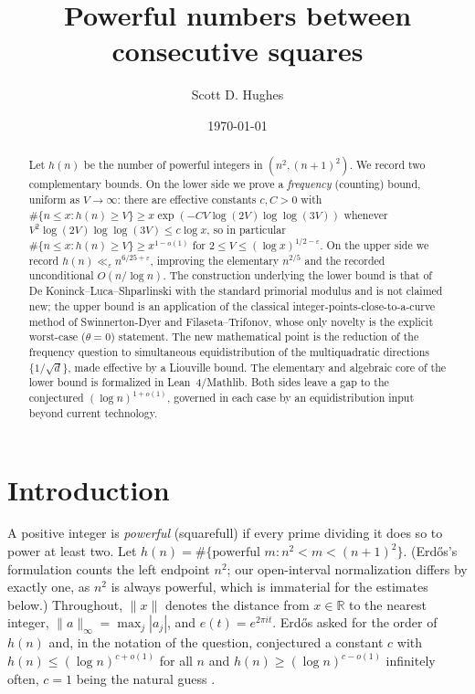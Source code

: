 \documentclass[11pt]{article}
\title{Powerful numbers between consecutive squares}
\author{Scott D. Hughes}
\date{\today}
\theoremstyle{definition}
\newcommand{\R}{\mathbb{R}}
\newcommand{\norm}[1]{\lVert #1 \rVert}
\begin{document}
\maketitle

\begin{abstract}
Let $h(n)$ be the number of powerful integers in $(n^2,(n+1)^2)$. We record two complementary bounds.
On the lower side we prove a \emph{frequency} (counting) bound, uniform as $V\to\infty$: there are effective
constants $c,C>0$ with $\#\{n\le x:h(n)\ge V\}\ge x\exp(-CV\log(2V)\log\log(3V))$ whenever
$V^2\log(2V)\log\log(3V)\le c\log x$, so in particular $\#\{n\le x:h(n)\ge V\}\ge x^{1-o(1)}$ for
$2\le V\le(\log x)^{1/2-\varepsilon}$. On the upper side we record $h(n)\ll_\varepsilon n^{6/25+\varepsilon}$,
improving the elementary $n^{2/5}$ and the recorded unconditional $O(n/\log n)$. The construction underlying
the lower bound is that of De Koninck--Luca--Shparlinski with the standard primorial modulus and is not
claimed new; the upper bound is an application of the classical integer-points-close-to-a-curve method of
Swinnerton-Dyer and Filaseta--Trifonov, whose only novelty is the explicit worst-case ($\theta=0$) statement.
The new mathematical point is the reduction of the frequency question to simultaneous equidistribution of the
multiquadratic directions $\{1/\sqrt d\}$, made effective by a Liouville bound. The elementary and algebraic
core of the lower bound is formalized in Lean~4/Mathlib. Both sides leave a gap to the conjectured
$(\log n)^{1+o(1)}$, governed in each case by an equidistribution input beyond current technology.
\end{abstract}

\section{Introduction}
A positive integer is \emph{powerful} (squarefull) if every prime dividing it does so to power at least
two. Let $h(n)=\#\{\text{powerful }m: n^2<m<(n+1)^2\}$. (Erd\H{o}s's formulation counts the left endpoint
$n^2$; our open-interval normalization differs by exactly one, as $n^2$ is always powerful, which is
immaterial for the estimates below.) Throughout, $\norm x$ denotes the distance from $x\in\R$ to the nearest
integer, $\norm a_\infty=\max_j|a_j|$, and $e(t)=e^{2\pi it}$. Erd\H{o}s asked for the order of $h(n)$ and,
in the notation of the question, conjectured a constant $c$ with $h(n)\le(\log n)^{c+o(1)}$ for all $n$ and
$h(n)\ge(\log n)^{c-o(1)}$ infinitely often, $c=1$ being the natural guess \cite{Erdos76,Erdos942}.
\end{document}
